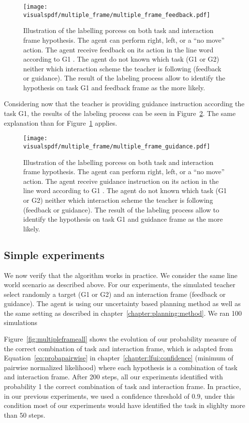 \begin{figure}[!ht]
\centering
\texttt{[image: \\visualspdf/multiple\_frame/multiple\_frame\_feedback.pdf]}
\caption{Illustration of the labelling porcess on both task and interaction frame hypothesis. The agent can perform right, left, or a ``no move'' action. The agent receive feedback on its action in the line word according to G1 . The agent do not known which task (G1 or G2) neither which interaction scheme the teacher is following (feedback or guidance). The result of the labeling process allow to identify the hypothesis on task G1 and feedback frame as the more likely.}
\label{fig:multipleframeexplainedfeedback}
\end{figure} 

Considering now that the teacher is providing guidance instruction according the task G1, the results of the labeling process can be seen in Figure~\ref{fig:multipleframeexplainedguidance}. The same explanation than for Figure~\ref{fig:multipleframeexplainedfeedback} applies. 

\begin{figure}[!ht]
\centering
\texttt{[image: \\visualspdf/multiple\_frame/multiple\_frame\_guidance.pdf]}
\caption{Illustration of the labelling porcess on both task and interaction frame hypothesis. The agent can perform right, left, or a ``no move'' action. The agent receive guidance instruction on its action in the line word according to G1 . The agent do not known which task (G1 or G2) neither which interaction scheme the teacher is following (feedback or guidance). The result of the labeling process allow to identify the hypothesis on task G1 and guidance frame as the more likely.}
\label{fig:multipleframeexplainedguidance}
\end{figure} 

\subsection{Simple experiments}

We now verify that the algorithm works in practice. We consider the same line world scenario as described above. For our experiments, the simulated teacher select randomly a target (G1 or G2) and an interaction frame (feedback or guidance). The agent is using our uncertainty based planning method as well as the same setting as described in chapter~\ref{chapter:planning:method}. We ran 100 simulations

Figure~\ref{fig:multipleframeall} shows the evolution of our probability measure of the correct combination of task and interaction frame, which is adapted from Equation~\ref{eq:probapairwise} in chapter~\ref{chapter:lfui:confidence} (minimum of pairwise normalized likelihood) where each hypothesis is a combination of task and interaction frame. After 200 steps, all our experiments identified with probability 1 the correct combination of task and interaction frame. In practice, in our previous experiments, we used a confidence threshold of 0.9, under this condition most of our experiments would have identified the task in slighlty more than 50 steps.


